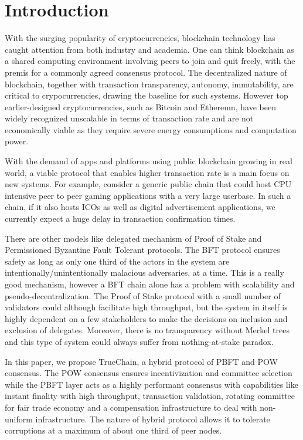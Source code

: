 \section{Introduction}

With the surging popularity of cryptocurrencies, blockchain technology has caught attention from both industry and academia.
One can think blockchain as a shared computing environment involving peers to join and quit freely, with the premis for a commonly
agreed consensus protocol. The decentralized nature of blockchain, together with transaction transparency, autonomy, immutability,
are critical to crypocurrencies, drawing the baseline for such systems. However top earlier-designed cryptocurrencies,
such as Bitcoin\cite{nakamoto2008bitcoin} and Ethereum\cite{buterinethereum}, have been widely recognized unscalable in terms
of transaction rate and are not economically viable as they require severe energy consumptions and computation power.

With the demand of apps and platforms using public blockchain growing in real world, a viable protocol that enables higher
transaction rate is a main focus on new systems. For example, consider a generic public chain that could host CPU intensive
peer to peer gaming applications with a very large userbase. In such a chain, if it also hosts ICOs as well as digital advertisement
applications, we currently expect a huge delay in transaction confirmation times.

There are other models like delegated mechanism of Proof of Stake and Permissioned Byzantine Fault Tolerant protocols.
The BFT protocol ensures safety as long as only one third of the actors in the system are intentionally/unintentionally malacious adversaries,
at a time. This is a really good mechanism, however a BFT chain alone has a problem with scalability and pseudo-decentralization.
The Proof of Stake protocol with a small number of validators could although facilitate high throughput, but the system in itself is
highly dependent on a few stakeholders to make the decisions on inclusion and exclusion of delegates. Moreover, there is no transparency
without Merkel trees and this type of system could always suffer from nothing-at-stake paradox.

In this paper, we propose TrueChain, a hybrid protocol\cite{pass2017hybrid} of PBFT\cite{castro1999practical} and POW consensus.
The POW consensus ensures incentivization and committee selection while the PBFT layer acts as a highly performant consensus
with capabilities like instant finality with high throughput, transaction validation, rotating committee for fair trade economy
and a compensation infrastructure to deal with non-uniform infrastructure. The nature of hybrid protocol allows it to tolerate
corruptions at a maximum of about one third of peer nodes.
